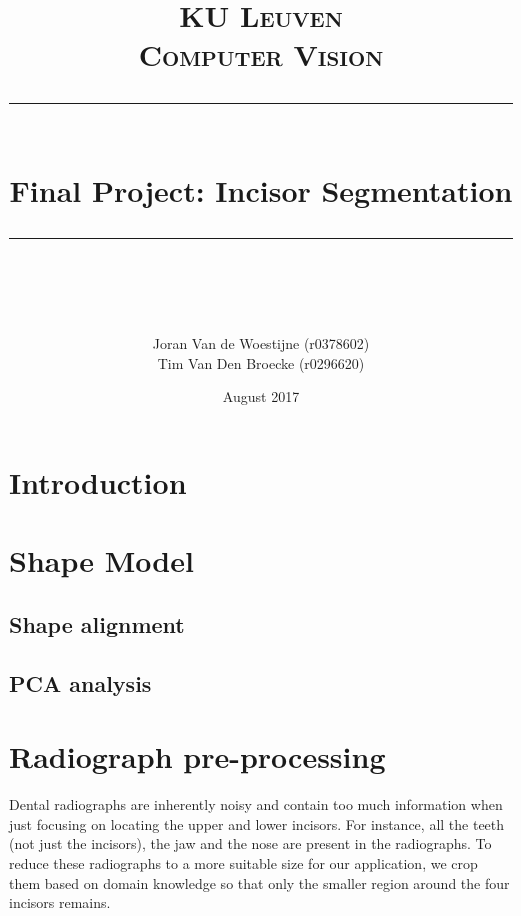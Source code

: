 \documentclass[a4paper,titlepage,12pt]{article}
\begin{document}
 
\newcommand{\horrule}[1]{\rule{\linewidth}{#1}}     %

\title{
        \normalfont \normalsize \textsc{KU Leuven} \\ [25pt]
        \normalfont \normalsize \textsc{Computer Vision} 
        \horrule{2pt} \\[0.5cm]
        \huge Final Project: Incisor Segmentation \\
        \horrule{2pt} \\[0.5cm]
}
\author{
        \normalfont            
        Joran Van de Woestijne (r0378602)\\
        Tim Van Den Broecke (r0296620)
}
\date{August 2017}
 
\maketitle

\newpage
\tableofcontents
\thispagestyle{empty}
\newpage
\setcounter{page}{1}

\section{Introduction}

\section{Shape Model}

\subsection{Shape alignment}

\subsection{PCA analysis}

\section{Radiograph pre-processing}

Dental radiographs are inherently noisy and contain too much information when just focusing on locating the upper and lower incisors.
For instance, all the teeth (not just the incisors), the jaw and the nose are present in the radiographs.
To reduce these radiographs to a more suitable size for our application, we crop them based on domain knowledge so that only the smaller region around the four incisors remains.
\end{document}
